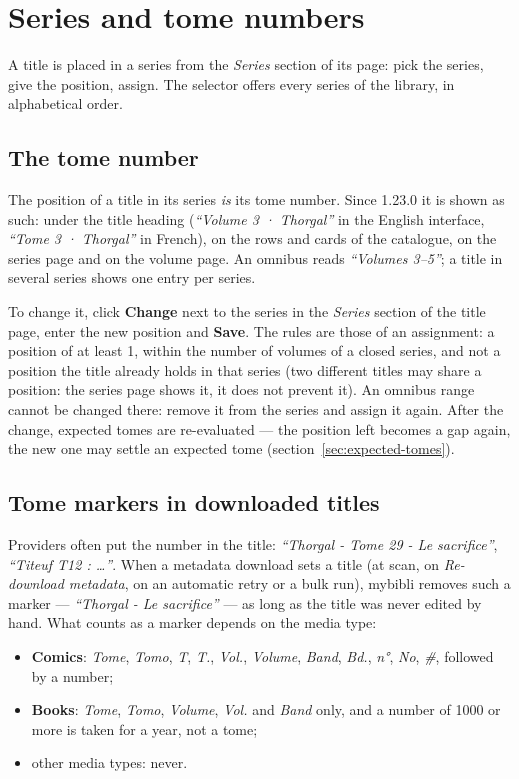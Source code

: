 \section{Series and tome numbers}\label{sec:tome-number}

A title is placed in a series from the \emph{Series} section of its
page: pick the series, give the position, assign. The selector offers
every series of the library, in alphabetical order.

\subsection*{The tome number}

The position of a title in its series \emph{is} its tome number.
Since 1.23.0 it is shown as such: under the title heading
(\emph{``Volume 3 · Thorgal''} in the English interface, \emph{``Tome
3 · Thorgal''} in French), on the rows and cards of the catalogue, on
the series page and on the volume page. An omnibus reads
\emph{``Volumes 3--5''}; a title in several series shows one entry per
series.

To change it, click \textbf{Change} next to the series in the
\emph{Series} section of the title page, enter the new position and
\textbf{Save}. The rules are those of an assignment: a position of at
least 1, within the number of volumes of a closed series, and not a
position the title already holds in that series (two different titles
may share a position: the series page shows it, it does not prevent
it). An omnibus range cannot be changed there: remove it from the
series and assign it again. After the change, expected tomes are
re-evaluated --- the position left becomes a gap again, the new one may
settle an expected tome (section~\ref{sec:expected-tomes}).

\subsection*{Tome markers in downloaded titles}

Providers often put the number in the title: \emph{``Thorgal - Tome 29
- Le sacrifice''}, \emph{``Titeuf T12 : \dots''}. When a metadata
download sets a title (at scan, on \emph{Re-download metadata}, on an
automatic retry or a bulk run), mybibli removes such a
marker --- \emph{``Thorgal - Le sacrifice''} --- as
long as the title was never edited by hand. What counts as a marker
depends on the media type:

\begin{itemize}
  \item \textbf{Comics}: \emph{Tome}, \emph{Tomo}, \emph{T}, \emph{T.},
        \emph{Vol.}, \emph{Volume}, \emph{Band}, \emph{Bd.},
        \emph{n°}, \emph{No}, \emph{\#}, followed by a number;
  \item \textbf{Books}: \emph{Tome}, \emph{Tomo}, \emph{Volume}, \emph{Vol.} and
        \emph{Band} only, and a number of 1000 or more is taken for a
        year, not a tome;
  \item other media types: never.
\end{itemize}

